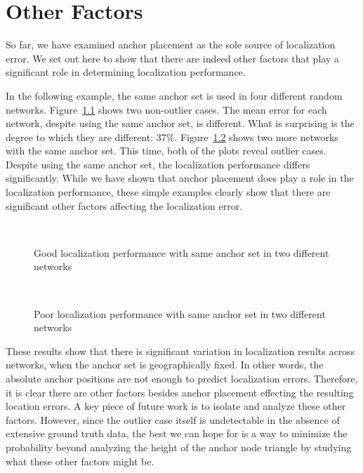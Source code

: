 \chapter{Other Factors}
\label{sec:otherfactors}

So far, we have examined anchor placement as the sole source of localization error.  We set out here to show that there are indeed other factors that play a significant role in determining localization performance.

In the following example, the same anchor set is used in four different random networks.  Figure~\ref{fig:AS6good} shows two non-outlier cases.  The mean error for each network, despite using the same anchor set, is different.  What is surprising is the degree to which they are different: 37\%.  Figure~\ref{fig:AS6bad} shows two more networks with the same anchor set.  This time, both of the plots reveal outlier cases.  Despite using the same anchor set, the localization performance differs significantly.  While we have shown that anchor placement does play a role in the localization performance, these simple examples clearly show that there are significant other factors affecting the localization error.

\begin{figure}
  \centering
	\\
	\caption{Good localization performance with same anchor set in two different networks}
	\label{fig:AS6good}
\end{figure}

\begin{figure}
  \centering
\\
    \caption{Poor localization performance with same anchor set in two different networks}
	\label{fig:AS6bad}
\end{figure}

These results show that there is significant variation in localization results across networks, when the anchor set is geographically fixed.  In other words, the absolute anchor positions are not enough to predict localization errors.  Therefore, it is clear there are other factors besides anchor placement effecting the resulting location errors. A key piece of future work is to isolate and analyze these other factors.  However, since the outlier case itself is undetectable in the absence of extensive ground truth data, the best we can hope for is a way to minimize the probability beyond analyzing the height of the anchor node triangle by studying what these other factors might be.  

